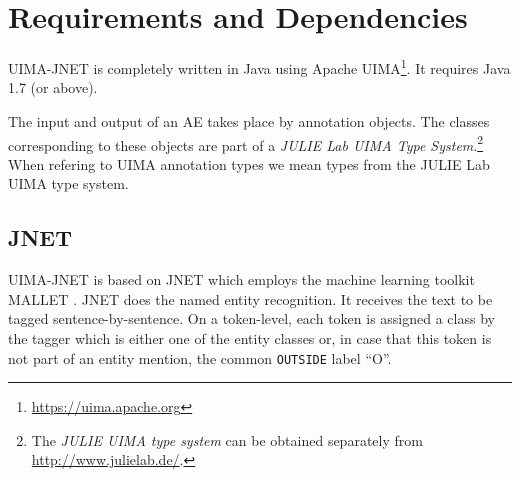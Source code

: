 \documentclass[11pt,a4paper,halfparskip]{scrartcl}
\begin{document}
%


\section{Requirements and Dependencies}

UIMA-JNET is completely written in Java using Apache UIMA\footnote{\url{https://uima.apache.org}}. It
requires Java 1.7 (or above).

The input and output of an AE takes place by annotation objects. The
classes corresponding to these objects are part of a \emph{JULIE Lab
  UIMA Type System}.\footnote{The \emph{JULIE UIMA type system} can be
  obtained separately from \url{http://www.julielab.de/}.} When refering to UIMA annotation types we mean types from
the JULIE Lab UIMA type system. 



\subsection{JNET}

UIMA-JNET is based on JNET which employs the machine learning toolkit
MALLET \cite{McCallum2002}. JNET does the named entity recognition. It
receives the text to be tagged sentence-by-sentence. On a token-level,
each token is assigned a class by the tagger which is either one of
the entity classes or, in case that this token is not part of an
entity mention, the common \texttt{OUTSIDE} label ``O''.
\end{document}
